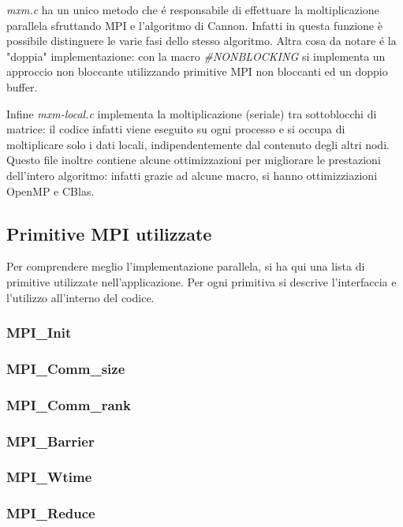 \textit{mxm.c} ha un unico metodo che \'{e} responsabile di effettuare la moltiplicazione parallela sfruttando MPI e l'algoritmo di Cannon. Infatti in questa funzione \`{e} possibile distinguere le varie fasi dello stesso algoritmo.
Altra cosa da notare \'{e} la "doppia" implementazione: con la macro \textit{\#NONBLOCKING} si implementa un approccio non bloccante utilizzando primitive MPI non bloccanti ed un doppio buffer.

Infine \textit{mxm-local.c} implementa la moltiplicazione (seriale) tra sottoblocchi di matrice: il codice infatti viene eseguito su ogni processo e si occupa di moltiplicare solo i dati locali, indipendentemente dal contenuto degli altri nodi. Questo file inoltre contiene alcune ottimizzazioni per migliorare le prestazioni dell'intero algoritmo: infatti grazie ad alcune macro, si hanno ottimizziazioni OpenMP e CBlas.

\subsection{Primitive MPI utilizzate}
Per comprendere meglio l'implementazione parallela, si ha qui una lista di primitive utilizzate nell'applicazione. Per ogni primitiva si descrive l'interfaccia e l'utilizzo all'interno del codice.

\subsubsection{MPI\_Init}

\subsubsection{MPI\_Comm\_size}

\subsubsection{MPI\_Comm\_rank}

\subsubsection{MPI\_Barrier}

\subsubsection{MPI\_Wtime}

\subsubsection{MPI\_Reduce}

